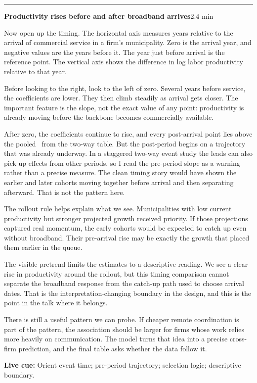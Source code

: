 \documentclass[11pt]{article}
\newcommand{\Cue}[1]{\par\nobreak\smallskip\noindent\textcolor{ScriptGray}{\footnotesize
  \textbf{Live cue:} #1}\par}
\newcommand{\scriptframe}[3]{%
  \Needspace{11\baselineskip}%
  \par\medskip\noindent\textcolor{ScriptBlue}{\rule{\linewidth}{0.55pt}}%
  \par\smallskip\noindent
  \textbf{#1}\hfill\textcolor{ScriptGray}{\small #2}\par\smallskip
  #3\par}
\begin{document}
\scriptframe{Productivity rises before and after broadband arrives}{2.4 min}{%
  Now open up the timing. The horizontal axis measures years relative to the
  arrival of commercial service in a firm's municipality. Zero is the arrival
  year, and negative values are the years before it. The year just before
  arrival is the reference point. The vertical axis shows the difference in log
  labor productivity relative to that year.

  Before looking to the right, look to the left of zero. Several years before
  service, the coefficients are lower. They then climb steadily as arrival gets
  closer. The important feature is the slope, not the exact value of any point:
  productivity is already moving before the backbone becomes commercially
  available.

  After zero, the coefficients continue to rise, and every post-arrival point
  lies above the pooled \ResBaseline\ from the two-way table. But the
  post-period begins on a trajectory that was already underway. In a staggered
  two-way event study the leads can also pick up effects from other periods, so
  I read the pre-period slope as a warning rather than a precise measure. The clean timing story would have
  shown the earlier and later cohorts moving together before arrival and then
  separating afterward. That is not the pattern here.

  The rollout rule helps explain what we see. Municipalities with low current
  productivity but stronger projected growth received priority. If those
  projections captured real momentum, the early cohorts would be expected to
  catch up even without broadband. Their pre-arrival rise may be exactly the
  growth that placed them earlier in the queue.

  The visible pretrend limits the estimates to a descriptive reading. We see a
  clear rise in productivity around the rollout, but this timing comparison
  cannot separate the broadband response from the catch-up path used to choose
  arrival dates. That is the interpretation-changing boundary in the design,
  and this is the point in the talk where it belongs.

  There is still a useful pattern we can probe. If cheaper remote
  coordination is part of the pattern, the association should be larger for
  firms whose work relies more heavily on communication. The model turns that
  idea into a precise cross-firm prediction, and the final table asks whether
  the data follow it.
  \Cue{Orient event time; pre-period trajectory; selection logic; descriptive boundary.}
}
\end{document}
